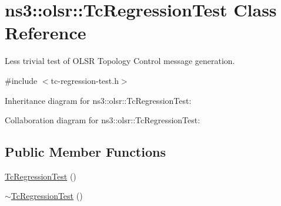 \hypertarget{classns3_1_1olsr_1_1TcRegressionTest}{}\section{ns3\+:\+:olsr\+:\+:Tc\+Regression\+Test Class Reference}
\label{classns3_1_1olsr_1_1TcRegressionTest}


Less trivial test of O\+L\+SR Topology Control message generation.  




{\ttfamily \#include $<$tc-\/regression-\/test.\+h$>$}



Inheritance diagram for ns3\+:\+:olsr\+:\+:Tc\+Regression\+Test\+:


Collaboration diagram for ns3\+:\+:olsr\+:\+:Tc\+Regression\+Test\+:
\subsection*{Public Member Functions}
\begin{DoxyCompactItemize}
\item 
\hyperlink{classns3_1_1olsr_1_1TcRegressionTest_a651b3bc7940d688e137a2c08f36c9f91}{Tc\+Regression\+Test} ()
\item 
\hyperlink{classns3_1_1olsr_1_1TcRegressionTest_a6b303b441e356f58f326775362aa6848}{$\sim$\+Tc\+Regression\+Test} ()
\end{DoxyCompactItemize}
